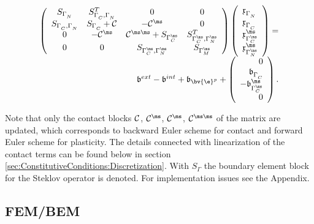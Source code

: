 \begin{equation*}
 \begin{array}{r}
   \left (
   \begin{array}{cccc}
   S_{\Gamma^{\sl}_N}    & S^{T}_{\Gamma^{\sl}_C,\Gamma^{\sl}_N}                 & 0                & 0\\
   S_{\Gamma^{\sl}_C,\Gamma^{\sl}_N} & S_{\Gamma^{\sl}_C} + \mathcal{C}^{\sl \sl}   & -\mathcal{C}^{\sl \ms}& 0 \\
   0               & -\mathcal{C}^{\ms \sl} & \mathcal{C}^{\ms \ms}+ S_{\Gamma^{\ms}_C}  & S^T_{\Gamma^{\ms}_C,\Gamma^{\ms}_N} \\
   0               & 0                 & S_{\Gamma^{\ms}_C,\Gamma^{\ms}_N} & S_{\Gamma^{\ms}_M}
   \end{array}
   \right )
 \left (
  \begin{array}{l}
      \mathfrak x^{\sl}_{\Gamma_N^{\sl}} \\
      \mathfrak x^{\sl}_{\Gamma_C^{\sl}} \\
      \mathfrak x^{\ms}_{\Gamma_C^{\ms}} \\
      \mathfrak x^{\ms}_{\Gamma_N^{\ms}} 
  \end{array}
 \right )
= \\
 {\mathfrak b}^{ext} - {\mathfrak b}^{int} + {\mathfrak b}_{\bv{\e}^p} +
 \left (
  \begin{array}{r}
      0 \\
      {\mathfrak b}^{\sl}_{\Gamma_C^{\sl}} \\
      -{\mathfrak b}^{\ms}_{\Gamma_C^{\ms}} \\
      0 
  \end{array}
 \right ).
 \end{array}
\end{equation*}

Note that only the contact blocks $\mathcal{C}^{\sl \sl}$, $\mathcal{C}^{\sl \ms}$, $\mathcal{C}^{\ms \sl}$, $\mathcal{C}^{\ms \ms}$ of the matrix are updated, which corresponds to backward Euler scheme for contact  and forward Euler scheme for plasticity. The details connected with linearization of the contact terms can be found below in section \ref{sec:ConstitutiveConditions:Discretization}. With $S_{\Gamma}$ the boundary element  block for the Steklov operator is denoted. For  implementation issues see the Appendix.

\subsection{FEM/BEM}\label{sec:FEMBEM}

